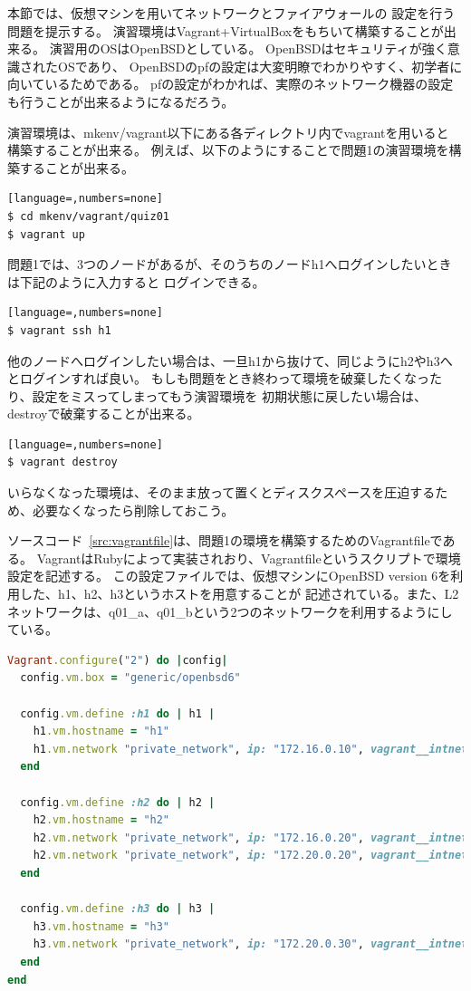 
本節では、仮想マシンを用いてネットワークとファイアウォールの
設定を行う問題を提示する。
演習環境はVagrant+VirtualBoxをもちいて構築することが出来る。
演習用のOSはOpenBSDとしている。
OpenBSDはセキュリティが強く意識されたOSであり、
OpenBSDのpfの設定は大変明瞭でわかりやすく、初学者に向いているためである。
pfの設定がわかれば、実際のネットワーク機器の設定も行うことが出来るようになるだろう。

演習環境は、mkenv/vagrant以下にある各ディレクトリ内でvagrantを用いると
構築することが出来る。
例えば、以下のようにすることで問題1の演習環境を構築することが出来る。
\begin{lstlisting}[language=,numbers=none]
$ cd mkenv/vagrant/quiz01
$ vagrant up
\end{lstlisting}
問題1では、3つのノードがあるが、そのうちのノードh1へログインしたいときは下記のように入力すると
ログインできる。
\begin{lstlisting}[language=,numbers=none]
$ vagrant ssh h1
\end{lstlisting}
他のノードへログインしたい場合は、一旦h1から抜けて、同じようにh2やh3へとログインすれば良い。
もしも問題をとき終わって環境を破棄したくなったり、設定をミスってしまってもう演習環境を
初期状態に戻したい場合は、destroyで破棄することが出来る。
\begin{lstlisting}[language=,numbers=none]
$ vagrant destroy
\end{lstlisting}
いらなくなった環境は、そのまま放って置くとディスクスペースを圧迫するため、必要なくなったら削除しておこう。

ソースコード~\ref{src:vagrantfile}は、問題1の環境を構築するためのVagrantfileである。
VagrantはRubyによって実装されおり、Vagrantfileというスクリプトで環境設定を記述する。
この設定ファイルでは、仮想マシンにOpenBSD version 6を利用した、h1、h2、h3というホストを用意することが
記述されている。また、L2ネットワークは、q01\_a、q01\_bという2つのネットワークを利用するようにしている。
\begin{lstlisting}[language=Ruby,caption=演習問題1のVagrantfile,label=src:vagrantfile]
Vagrant.configure("2") do |config|
  config.vm.box = "generic/openbsd6"

  config.vm.define :h1 do | h1 |
    h1.vm.hostname = "h1"
    h1.vm.network "private_network", ip: "172.16.0.10", vagrant__intnet: "q01_a"
  end

  config.vm.define :h2 do | h2 |
    h2.vm.hostname = "h2"
    h2.vm.network "private_network", ip: "172.16.0.20", vagrant__intnet: "q01_a"
    h2.vm.network "private_network", ip: "172.20.0.20", vagrant__intnet: "q01_b"
  end

  config.vm.define :h3 do | h3 |
    h3.vm.hostname = "h3"
    h3.vm.network "private_network", ip: "172.20.0.30", vagrant__intnet: "q01_b"
  end
end
\end{lstlisting}


